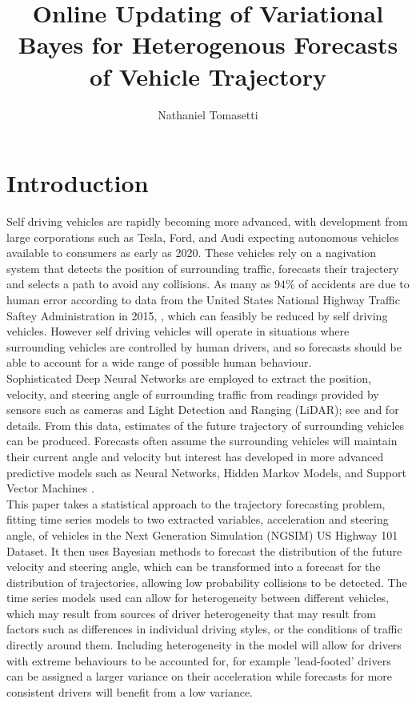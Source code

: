 \documentclass[12pt,a4paper]{article}\usepackage[]{graphicx}\usepackage[]{color}
\title{Online Updating of Variational Bayes for Heterogenous Forecasts of Vehicle Trajectory}
\author{Nathaniel Tomasetti}
\date{}
\begin{document}
\maketitle



\section{Introduction}
\label{sec:intro}

Self driving vehicles are rapidly becoming more advanced, with development from large corporations such as Tesla, Ford, and Audi expecting autonomous vehicles available to consumers as early as 2020. These vehicles rely on a nagivation system that detects the position of surrounding traffic, forecasts their trajectery and selects a path to avoid any collisions. As many as $94\%$ of accidents are due to human error according to data from the United States National Highway Traffic Saftey Administration in 2015, \citep{NHTSA2015}, which can feasibly be reduced by self driving vehicles. However self driving vehicles will operate in situations where surrounding vehicles are controlled by human drivers, and so forecasts should be able to account for a wide range of possible human behaviour.
\\

Sophisticated Deep Neural Networks are employed to extract the position, velocity, and steering angle of surrounding traffic from readings provided by sensors such as cameras and Light Detection and Ranging (LiDAR); see \citet{Woo2016a} and \citet{Tian2017} for details. From this data, estimates of the future trajectory of surrounding vehicles can be produced. Forecasts often assume the surrounding vehicles will maintain their current angle and velocity \citep{Gindele2010, Houenou2013, Bautista2017, Waymo2017} but interest has developed in more advanced predictive models such as Neural Networks, Hidden Markov Models, and Support Vector Machines \citep{Ding2013, Woo2016b, Geng2017, Woo2017}.
\\

This paper takes a statistical approach to the trajectory forecasting problem, fitting time series models to two extracted variables, acceleration and steering angle, of vehicles in the Next Generation Simulation (NGSIM) US Highway 101 Dataset. It then uses Bayesian methods to forecast the distribution of the future velocity and steering angle, which can be transformed into a forecast for the distribution of trajectories, allowing low probability collisions to be detected. The time series models used can allow for heterogeneity between different vehicles, which may result from sources of driver heterogeneity that may result from factors such as differences in individual driving styles, or the conditions of traffic directly around them.
Including heterogeneity in the model will allow for drivers with extreme behaviours to be accounted for, for example 'lead-footed' drivers can be assigned a larger variance on their acceleration while forecasts for more consistent drivers will benefit from a low variance.
\\
\end{document}
